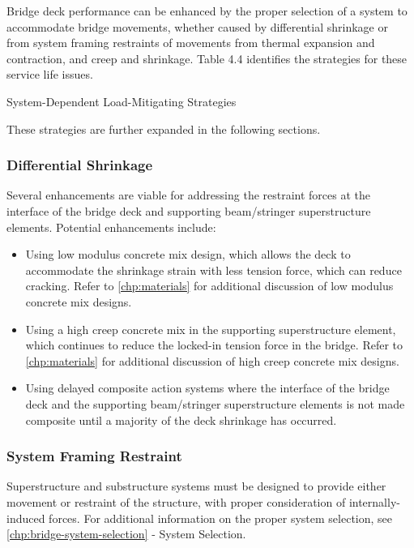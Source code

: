 Bridge deck performance can be enhanced by the proper selection of a system to accommodate bridge
movements, whether caused by differential shrinkage or from system framing restraints of movements from thermal
expansion and contraction, and creep and shrinkage. Table 4.4 identifies the strategies for these service life issues.


\begin{table}
  \caption{System-Dependent Load-Mitigating Strategies}
  \label{tab:system-dependent-strategy}
\end{table}

These strategies are further expanded in the following sections.

\subsubsection{Differential Shrinkage}
Several enhancements are viable for addressing the restraint forces at the interface of the bridge deck and
supporting beam/stringer superstructure elements. Potential enhancements include:
\begin{itemize}
  \item Using low modulus concrete mix design, which allows the deck to accommodate the shrinkage strain with
  less tension force, which can reduce cracking. Refer to \cref{chp:materials} for additional discussion of low modulus
  concrete mix designs.
  \item Using a high creep concrete mix in the supporting superstructure element, which continues to reduce the
  locked-in tension force in the bridge. Refer to \cref{chp:materials} for additional discussion of high creep concrete mix
  designs.
  \item Using delayed composite action systems where the interface of the bridge deck and the supporting
  beam/stringer superstructure elements is not made composite until a majority of the deck shrinkage has
  occurred.
\end{itemize}

\subsubsection{System Framing Restraint}
Superstructure and substructure systems must be designed to provide either movement or restraint of the structure, with proper consideration of internally-induced forces. For additional information on the proper system
selection, see \cref{chp:bridge-system-selection} - System Selection.

